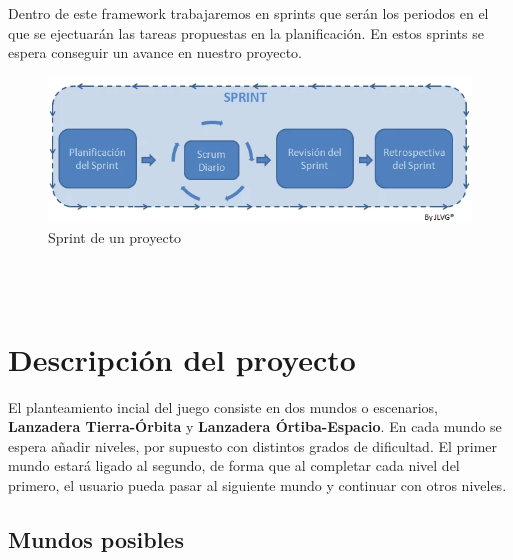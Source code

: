 \documentclass{article}
\begin{document}
Dentro de este framework trabajaremos en sprints que serán los periodos en el que se ejectuarán las tareas propuestas en la planificación. En estos sprints se espera conseguir un avance en nuestro proyecto\cite{sprint}.

\begin{figure}[h]
\includegraphics[width=12cm]{sprint_img.png}
\centering
\caption{Sprint de un proyecto}
\label{fig:sprint_img}
\end{figure}

\\\\
\section{Descripción del proyecto} \label{imagenes}
El planteamiento incial del juego consiste en dos mundos o escenarios, \textbf{Lanzadera Tierra-Órbita} y \textbf{Lanzadera Órtiba-Espacio}. En cada mundo se espera añadir niveles, por supuesto con distintos grados de dificultad. El primer mundo estará ligado al segundo, de forma que al completar cada nivel del primero, el usuario pueda pasar al siguiente mundo y continuar con otros niveles.

\subsection{Mundos posibles}
\end{document}
